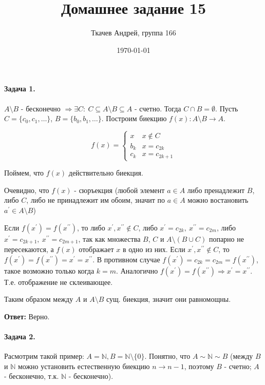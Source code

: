 \documentclass{article}
\title{Домашнее задание 15}
\author{Ткачев Андрей, группа 166}
\date{\today}
\newcommand{\pr}{^{\prime}}
\newcommand{\xp}{x^{\prime}}
\newcommand{\xpp}{x^{\prime\prime}}
\newcommand{\N}{\mathbb{N}}
\begin{document}
    \maketitle
    \paragraph{Задача 1.}
    $A \setminus B$ - бесконечно $\Rightarrow \exists C:\ C \subseteq A \setminus B \subseteq A$ - счетно. Тогда $C \cap B = \emptyset$. Пусть $C = \{c_0, c_1, \ldots\}$, $B = \{b_0, b_1, \ldots\}$. Построим биекцию $f(x): A \setminus B \rightarrow  A$.

    \begin{equation*}
        f(x) = 
         \begin{cases}
           x &\text{$x \notin C$}\\
           b_{k} &\text{$x = c_{2k}$}\\
           c_{k} &\text{$x = c_{2k + 1}$}
         \end{cases}
    \end{equation*} 

    Поймем, что $f(x)$ действительно биекция. 

    Очевидно, что $f(x)$ - сюръекция (любой элемент $a \in A$ либо пренадлежит $B$, либо $C$, либо не принадлежит им обоим, значит по $a \in A$ можно востановить $a\pr \in A \setminus B$)

    Если $f(\xp) = f(\xpp)$, то либо $\xp, \xpp \notin C$, либо $\xp = c_{2k},\ \xpp = c_{2m}$, 
    либо $\xp =c_{2k + 1},\ \xpp = c_{2m + 1}$, так как множества $B$, $C$ и 
    $A \setminus (B \cup C)$ попарно не пересекаются, а $f(x)$ отображает $x$ в одно из них. 
    Если $\xp, \xpp \notin C$, то $f(\xp) = f(\xpp) = \xp = \xpp$. 
    В противном случае $f(\xp) = c_{2k} = c_{2m} = f(\xpp)$, такое возможно только когда $k = m$. Аналогично $f(\xp) = f(\xpp) \Rightarrow \xp=\xpp$. Т.е. отображение не склеивающее.

    Таким образом между $A$ и $A \setminus B$ сущ. биекция, значит они равномощны.

    \textbf{Ответ:} Верно.

    \paragraph{Задача 2.}
    Расмотрим такой пример: $A = \mathbb{N}, B = \mathbb{N} \setminus \{0\}$. Понятно, что $A \sim \N \sim B$ (между $B$ и $\N$ можно установить естественную биекцию $n \rightarrow n - 1$, поэтому $B$ - счетно; $A$ - бесконечно, т.к. $\N$ - бесконечно). 
\end{document}
